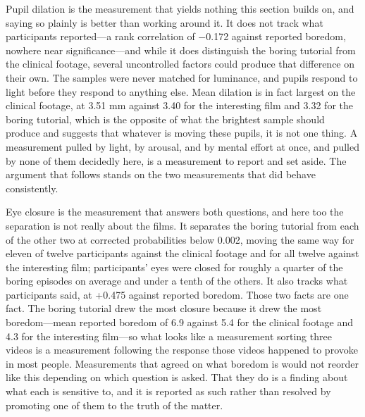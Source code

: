 Pupil dilation is the measurement that yields nothing this section builds on, and saying so
plainly is better than working around it. It does not track what participants reported---a rank
correlation of $-$0.172 against reported boredom, nowhere near significance---and while it does
distinguish the boring tutorial from the clinical footage, several uncontrolled factors could
produce that difference on their own. The samples were never matched for luminance, and pupils
respond to light before they respond to anything else. Mean dilation is in fact largest on the
clinical footage, at 3.51 mm against 3.40 for the interesting film and 3.32 for the boring
tutorial, which is the opposite of what the brightest sample should produce and suggests that
whatever is moving these pupils, it is not one thing. A measurement pulled by light, by arousal,
and by mental effort at once, and pulled by none of them decidedly here, is a measurement to
report and set aside. The argument that follows stands on the two measurements that did behave
consistently.

Eye closure is the measurement that answers both questions, and here too the separation is not
really about the films. It separates the boring tutorial from each of the other two at corrected
probabilities below 0.002, moving the same way for eleven of twelve participants against the
clinical footage and for all twelve against the interesting film; participants' eyes were closed
for roughly a quarter of the boring episodes on average and under a tenth of the others. It also
tracks what participants said, at +0.475 against reported boredom. Those two facts are one fact.
The boring tutorial drew the most closure because it drew the most boredom---mean reported
boredom of 6.9 against 5.4 for the clinical footage and 4.3 for the interesting film---so what
looks like a measurement sorting three videos is a measurement following the response those
videos happened to provoke in most people. Measurements that agreed on what boredom is would not
reorder like this depending on which question is asked. That they do is a finding about what each
is sensitive to, and it is reported as such rather than resolved by promoting one of them to the
truth of the matter.

